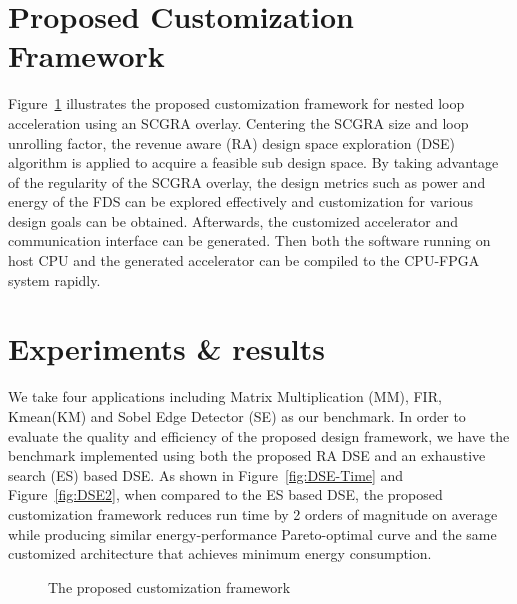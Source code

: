 \documentclass{acm_proc_article-sp}
\newcommand{\figref}[1]{Figure~\ref{#1}}
\begin{document}
\section{Proposed Customization Framework} \label{sec:dse-framework}
\figref{fig:customization-framework} illustrates the proposed customization 
framework for nested loop acceleration using an SCGRA overlay. Centering the 
SCGRA size and loop unrolling factor, the revenue aware (RA) 
design space exploration (DSE) algorithm is applied to acquire a feasible 
sub design space. By taking advantage 
of the regularity of the SCGRA overlay, the design metrics such as power and energy 
of the FDS can be explored effectively and customization 
for various design goals can be obtained. Afterwards, the customized 
accelerator and communication interface can be generated. Then both the 
software running on host CPU and the generated accelerator can be compiled to  
the CPU-FPGA system rapidly. 
 
\section{Experiments \& results}
We take four applications including Matrix Multiplication (MM), 
FIR, Kmean(KM) and Sobel Edge Detector (SE) as our benchmark. In order to 
evaluate the quality and efficiency of the proposed design framework, we
have the benchmark implemented using both the proposed RA 
DSE and an exhaustive search (ES) based DSE. As shown in 
\figref{fig:DSE-Time} and \figref{fig:DSE2}, when compared to the ES based DSE,
the proposed customization framework reduces run time by 2 orders 
of magnitude on average while producing similar energy-performance 
Pareto-optimal curve and the same customized architecture 
that achieves minimum energy consumption. 
\begin{figure}[tbh]
\caption{The proposed customization framework}
\label{fig:customization-framework}
\end{figure}
\end{document}
